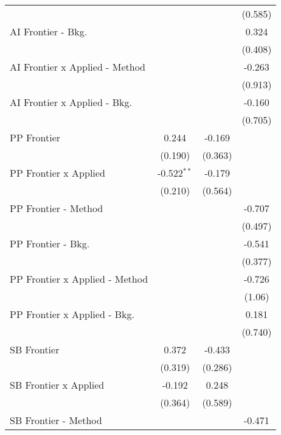 \begin{tabular}{lccc}
                                  &               &         & (0.585)\\   
   AI Frontier - Bkg.             &               &         & 0.324\\   
                                  &               &         & (0.408)\\   
   AI Frontier x Applied - Method &               &         & -0.263\\   
                                  &               &         & (0.913)\\   
   AI Frontier x Applied - Bkg.   &               &         & -0.160\\   
                                  &               &         & (0.705)\\   
   PP Frontier                    & 0.244         & -0.169  &   \\   
                                  & (0.190)       & (0.363) &   \\   
   PP Frontier x Applied          & -0.522$^{**}$ & -0.179  &   \\   
                                  & (0.210)       & (0.564) &   \\   
   PP Frontier - Method           &               &         & -0.707\\   
                                  &               &         & (0.497)\\   
   PP Frontier - Bkg.             &               &         & -0.541\\   
                                  &               &         & (0.377)\\   
   PP Frontier x Applied - Method &               &         & -0.726\\   
                                  &               &         & (1.06)\\   
   PP Frontier x Applied - Bkg.   &               &         & 0.181\\   
                                  &               &         & (0.740)\\   
   SB Frontier                    & 0.372         & -0.433  &   \\   
                                  & (0.319)       & (0.286) &   \\   
   SB Frontier x Applied          & -0.192        & 0.248   &   \\   
                                  & (0.364)       & (0.589) &   \\   
   SB Frontier - Method           &               &         & -0.471\\   

\end{tabular}
